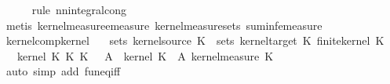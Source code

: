 \begin{isabellebody}
\ \ \ \ \isamarkupfalse%
\ {\isacharparenleft}{\kern0pt}rule\ nn{\isacharunderscore}{\kern0pt}integral{\isacharunderscore}{\kern0pt}cong{\isacharparenright}{\kern0pt}\isanewline
\ \ \ \ \isamarkupfalse%
\ {\isacharparenleft}{\kern0pt}metis\ kernel{\isacharunderscore}{\kern0pt}measure{\isacharunderscore}{\kern0pt}emeasure\ kernel{\isacharunderscore}{\kern0pt}measure{\isacharunderscore}{\kern0pt}sets\ suminf{\isacharunderscore}{\kern0pt}emeasure{\isacharparenright}{\kern0pt}\isanewline
\ \ \ \ \isamarkupfalse%
\isanewline
{}\isamarkupfalse%
%
\endisatagproof
{\isafoldproof}%
%
\isadelimproof
\isanewline
%
\endisadelimproof
\isanewline
{}\isamarkupfalse%
\ kernel{\isacharunderscore}{\kern0pt}comp{\isacharunderscore}{\kern0pt}kernel{\isacharcolon}{\kern0pt}\isanewline
\ \ \ {\isachardoublequoteopen}sets\ {\isacharparenleft}{\kern0pt}kernel{\isacharunderscore}{\kern0pt}source\ K\ {\isacharequal}{\kern0pt}\ sets\ {\isacharparenleft}{\kern0pt}kernel{\isacharunderscore}{\kern0pt}target\ K\ {\isachardoublequoteopen}finite{\isacharunderscore}{\kern0pt}kernel\ K\isanewline
\ \ \ {\isachardoublequoteopen}kernel\ {\isacharparenleft}{\kern0pt}K\ {\isasymcirc}\isactrlsub K\ K\ {\isacharequal}{\kern0pt}\ {\isacharparenleft}{\kern0pt}{\isasymlambda}{\isasymomega}\ A\ {\isasymintegral}\isactrlsup {\isacharplus}{\kern0pt}{\isasymomega}\ kernel\ K\ {\isasymomega}\ A\ {\isasympartial}{\isacharparenleft}{\kern0pt}{\isacharparenleft}{\kern0pt}kernel{\isacharunderscore}{\kern0pt}measure\ K\ {\isasymomega}\isanewline
%
\isadelimproof
\ \ %
\endisadelimproof
%
\isatagproof
{}\isamarkupfalse%
\ {\isacharparenleft}{\kern0pt}auto\ simp\ add{\isacharcolon}{\kern0pt}\ fun{\isacharunderscore}{\kern0pt}eq{\isacharunderscore}{\kern0pt}iff{\isacharparenright}{\kern0pt}\isanewline
\ \ \isamarkupfalse%

\end{isabellebody}
